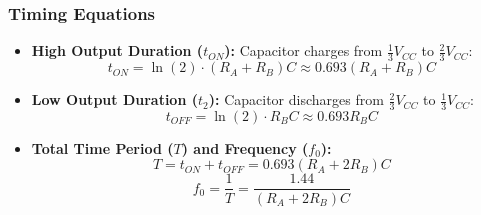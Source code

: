 \subsubsection{Timing Equations}
\begin{itemize}
	\item \textbf{High Output Duration ($t_{ON}$):} Capacitor charges from $\frac{1}{3} V_{CC}$ to $\frac{2}{3} V_{CC}$:
	\begin{equation}
		t_{ON} = \ln(2) \cdot (R_A + R_B) C \approx 0.693 (R_A + R_B) C
	\end{equation}
	
	\item \textbf{Low Output Duration ($t_2$):} Capacitor discharges from $\frac{2}{3} V_{CC}$ to $\frac{1}{3} V_{CC}$:
	\begin{equation}
		t_{OFF} = \ln(2) \cdot R_B C \approx 0.693 R_B C
	\end{equation}
	
	\item \textbf{Total Time Period ($T$) and Frequency ($f_0$):}
	\begin{equation}
		T = t_{ON} + t_{OFF} = 0.693 (R_A + 2 R_B) C
	\end{equation}
	\begin{equation}
		f_0 = \frac{1}{T} = \frac{1.44}{(R_A + 2 R_B) C}
	\end{equation}
\end{itemize}

